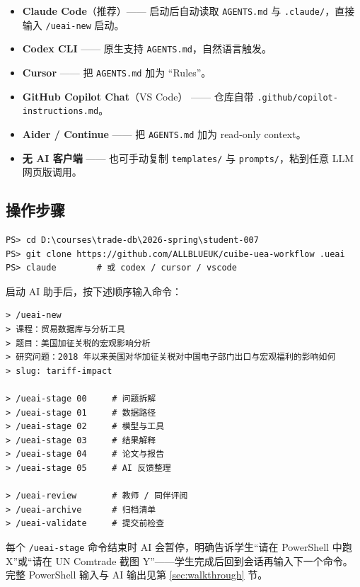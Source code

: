 \documentclass[12pt,a4paper]{article}
\begin{document}
\begin{itemize}[leftmargin=*]
  \item \textbf{Claude Code}（推荐）—— 启动后自动读取 \texttt{AGENTS.md} 与 \texttt{.claude/}，直接输入 \texttt{/ueai-new} 启动。
  \item \textbf{Codex CLI} —— 原生支持 \texttt{AGENTS.md}，自然语言触发。
  \item \textbf{Cursor} —— 把 \texttt{AGENTS.md} 加为 ``Rules''。
  \item \textbf{GitHub Copilot Chat}（VS Code） —— 仓库自带 \texttt{.github/copilot-instructions.md}。
  \item \textbf{Aider / Continue} —— 把 \texttt{AGENTS.md} 加为 read-only context。
  \item \textbf{无 AI 客户端} —— 也可手动复制 \texttt{templates/} 与 \texttt{prompts/}，粘到任意 LLM 网页版调用。
\end{itemize}

\subsection{操作步骤}

\begin{lstlisting}[style=shell,caption={第一次使用（任意学生电脑，PowerShell）}]
PS> cd D:\courses\trade-db\2026-spring\student-007
PS> git clone https://github.com/ALLBLUEUK/cuibe-uea-workflow .ueai
PS> claude        # 或 codex / cursor / vscode
\end{lstlisting}

启动 AI 助手后，按下述顺序输入命令：

\begin{lstlisting}[style=prompt]
> /ueai-new
> 课程：贸易数据库与分析工具
> 题目：美国加征关税的宏观影响分析
> 研究问题：2018 年以来美国对华加征关税对中国电子部门出口与宏观福利的影响如何
> slug: tariff-impact

> /ueai-stage 00     # 问题拆解
> /ueai-stage 01     # 数据路径
> /ueai-stage 02     # 模型与工具
> /ueai-stage 03     # 结果解释
> /ueai-stage 04     # 论文与报告
> /ueai-stage 05     # AI 反馈整理

> /ueai-review       # 教师 / 同伴评阅
> /ueai-archive      # 归档清单
> /ueai-validate     # 提交前检查
\end{lstlisting}

每个 \texttt{/ueai-stage} 命令结束时 AI 会暂停，明确告诉学生``请在 PowerShell 中跑 X''或``请在 UN Comtrade 截图 Y''——学生完成后回到会话再输入下一个命令。完整 PowerShell 输入与 AI 输出见第 \ref{sec:walkthrough} 节。
\end{document}
